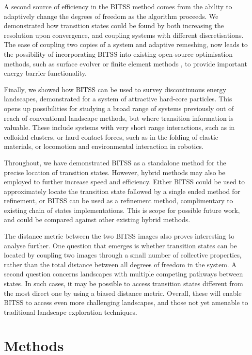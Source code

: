 \documentclass[twocolumn,10pt]{revtex4}
\begin{document}
A second source of efficiency in the BITSS method comes from the ability to adaptively change the degrees of freedom as the algorithm proceeds.
We demonstrated how transition states could be found by both increasing the resolution upon convergence, and coupling systems with different discretisations.
The ease of coupling two copies of a system and adaptive remeshing, now leads to the possibility of incorporating BITSS into existing open-source optimisation methods, such as surface evolver \cite{Brakke1992} or finite element methods \cite{Kolev2021}, to provide important energy barrier functionality.

Finally, we showed how BITSS can be used to survey discontinuous energy landscapes, demonstrated for a system of attractive hard-core particles.
This opens up possibilities for studying a broad range of systems previously out of reach of conventional landscape methods, but where transition information is valuable.
These include systems with very short range interactions, such as in colloidal clusters, or hard contact forces, such as in the folding of elastic materials, or locomotion and environmental interaction in robotics.

Throughout, we have demonstrated BITSS as a standalone method for the precise location of transition states.
However, hybrid methods may also be employed to further increase speed and efficiency.
Either BITSS could be used to approximately locate the transition state followed by a single ended method for refinement, or BITSS can be used as a refinement method, complimentary to existing chain of states implementations.
This is scope for possible future work, and could be compared against other existing hybrid methods.

The distance metric between the two BITSS images also proves interesting to analyse further.
One question that emerges is whether transition states can be located by coupling two images through a small number of collective properties, rather than the total distance between all degrees of freedom in the system.
A second question concerns landscapes with multiple competing pathways between states.
In such cases, it may be possible to access transition states different from the most direct one by using a biased distance metric.
Overall, these will enable BITSS to access even more challenging landscapes, and those not yet amenable to traditional landscape exploration techniques.


\section{Methods}
\end{document}
